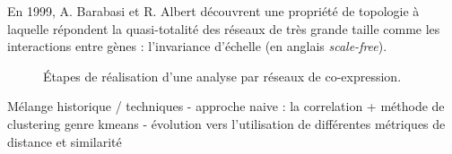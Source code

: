 En 1999, A. Barabasi et R. Albert découvrent une propriété de topologie à laquelle répondent la quasi-totalité des réseaux de très grande taille comme les interactions entre gènes : l'invariance d'échelle (en anglais \textit{scale-free}). 



\begin{figure}
    \centering
    \caption{Étapes de réalisation d'une analyse par réseaux de co-expression.}
    \label{fig:coexpr_pipeline}
\end{figure}


Mélange historique / techniques
- approche naive : la correlation + méthode de clustering genre kmeans
- évolution vers l'utilisation de différentes métriques de distance et similarité








